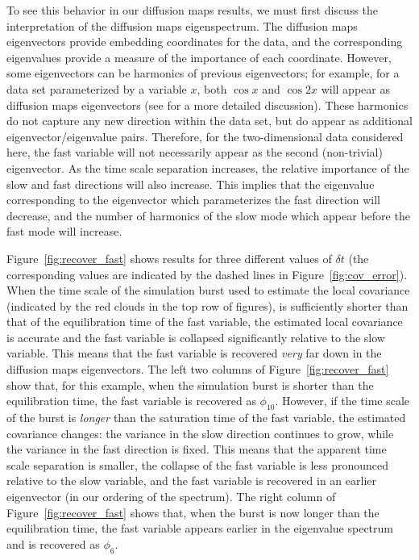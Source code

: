 To see this behavior in our diffusion maps results, we must first discuss the interpretation of the diffusion maps eigenspectrum.
%
The diffusion maps eigenvectors provide embedding coordinates for the data, and the corresponding eigenvalues provide a measure of the importance of each coordinate.
%
However, some eigenvectors can be harmonics of previous eigenvectors; for example, for a data set parameterized by a variable $x$, both $\cos x$ and $\cos 2x$ will appear as diffusion maps eigenvectors (see \cite{ferguson2010systematic} for a more detailed discussion).
%
These harmonics do not capture any new direction within the data set, but do appear as additional eigenvector/eigenvalue pairs.
%
Therefore, for the two-dimensional data considered here, the fast variable will not necessarily appear as the second (non-trivial) eigenvector.
%
As the time scale separation increases, the relative importance of the slow and fast directions will also increase.
%
This implies that the eigenvalue corresponding to the eigenvector which parameterizes the fast direction will decrease, and the number of harmonics of the slow mode which appear before the fast mode will increase.

Figure~\ref{fig:recover_fast} shows results for three different values of $\delta t$ (the corresponding values are indicated by the dashed lines in Figure~\ref{fig:cov_error}).
%
When the time scale of the simulation burst used to estimate the local covariance (indicated by the red clouds in the top row of figures), is sufficiently shorter than that of the equilibration time of the fast variable, the estimated local covariance is accurate and the fast variable is collapsed significantly relative to the slow variable.
%
This means that the fast variable is recovered {\em very} far down in the diffusion maps eigenvectors.
%
The left two columns of Figure~\ref{fig:recover_fast} show that, for this example, when the simulation burst is shorter than the equilibration time, the fast variable is recovered as $\phi_{10}$.
%
However, if the time scale of the burst is {\em longer} than the saturation time of the fast variable, the estimated covariance changes: the variance in the slow direction continues to grow, while the variance in the fast direction is fixed.
%
This means that the apparent time scale separation is smaller, the collapse of the fast variable is less pronounced relative to the slow variable, and the fast variable is recovered in an earlier eigenvector (in our ordering of the spectrum).
%
The right column of Figure~\ref{fig:recover_fast} shows that, when the burst is now longer than the equilibration time, the fast variable appears earlier in the eigenvalue spectrum and is recovered as $\phi_6$.

